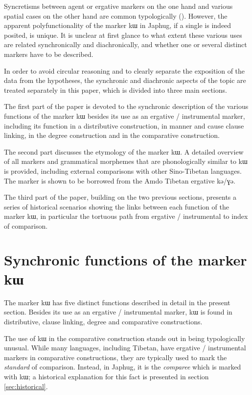 \documentclass[oldfontcommands,oneside,a4paper,11pt]{article}
\newcommand{\ipa}[1]{{\phon #1}} %
\begin{document}
Syncretisms between agent or ergative markers  on the one hand and various spatial cases on the other hand are common typologically (\citealt{agent02palancar}). However, the apparent polyfunctionality of the marker \ipa{kɯ} in Japhug, if a single is indeed posited, is unique. It is unclear at first glance to what extent these various uses are related synchronically and diachronically, and whether one or several distinct markers have to be described. 
 
 In order to avoid circular reasoning and to clearly  separate the exposition of the data from the hypotheses, the synchronic and diachronic aspects of the topic are treated separately in this paper, which is divided into three main sections.

The first part of the paper is devoted to the synchronic description of the various functions of the marker \ipa{kɯ} besides its use as an ergative / instrumental marker, including its function in a distributive construction, in manner and cause clause linking, in the degree construction and in the comparative construction. 


The second part discusses the etymology of the marker \ipa{kɯ}. A detailed overview of all markers and grammatical morphemes that are phonologically similar to \ipa{kɯ} is provided, including external comparisons with other Sino-Tibetan languages.  The marker is shown to be borrowed from the Amdo Tibetan ergative \ipa{kə/ɣə}.

  The third part of the paper, building on the two previous sections, presents a series of historical scenarios showing the links between each function of the marker \ipa{kɯ}, in particular the tortuous path from ergative / instrumental to index of comparison.


\section{Synchronic functions of the marker \ipa{kɯ}} \label{sec:synchronic}
The marker \ipa{kɯ} has five distinct functions described in detail in the present section. Besides its use as an ergative / instrumental marker, \ipa{kɯ} is found in distributive, clause linking, degree and comparative constructions. 

The use of \ipa{kɯ} in the comparative construction stands out in being typologically unusual.  While many languages, including Tibetan, have ergative / instrumental markers in comparative constructions, they are typically used to mark the \textit{standard} of comparison. Instead, in Japhug,  it is the \textit{comparee} which is marked with \ipa{kɯ}; a historical explanation for this fact is presented in section \ref{sec:historical}.
\end{document}
